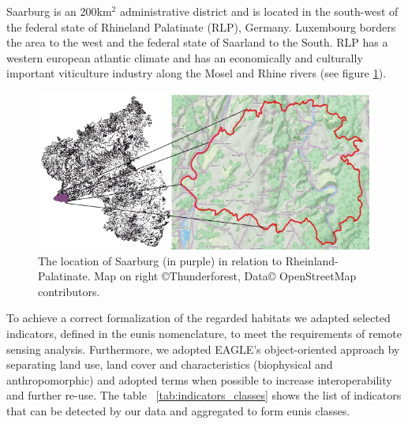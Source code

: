 \documentclass[authoryear,preprint,12pt,number]{elsarticle}
\begin{document}
Saarburg is an 200km$^{2}$ administrative district and is located in the
south-west of the federal state of Rhineland Palatinate (RLP), Germany.
Luxembourg borders the area to the west and the federal state of Saarland to
the South. RLP has a western european atlantic climate and has an economically
and culturally important viticulture industry along the Mosel and Rhine rivers
(see figure \ref{fig:study_area}).
\begin{figure}
    \includegraphics[width=\textwidth]{diagrams/study_area_closeup.png}
    \caption{The location of Saarburg (in purple) in relation to
    Rheinland-Palatinate. Map on right \copyright Thunderforest, Data\copyright
    OpenStreetMap contributors.}
\label{fig:study_area}
\end{figure}
To achieve a correct formalization of the regarded habitats we adapted selected
indicators, defined in the \gls{eunis} nomenclature, to meet the 
requirements of
remote sensing analysis.
Furthermore, we adopted EAGLE's object-oriented approach by separating land 
use, land cover and characteristics (biophysical and anthropomorphic) and 
adopted terms when possible to increase interoperability and further re-use. 
The table ~\ref{tab:indicators_classes} shows the list of indicators that can 
be detected by our data and aggregated to form \gls{eunis} classes. 
\end{document}
